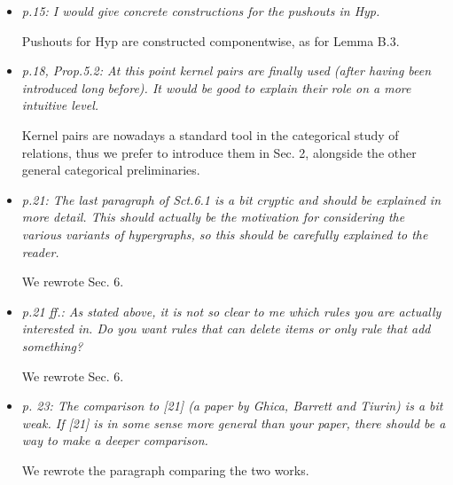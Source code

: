 \documentclass[english,11pt,a4paper]{article}
\begin{document}
\begin{itemize}
		\item \emph{ p.15: I would give concrete constructions for the pushouts in Hyp.}
		
		Pushouts for Hyp are constructed componentwise, as for Lemma B.3.
		
		\item \emph{ p.18, Prop.5.2: At this point kernel pairs are finally used (after
			having been introduced long before). It would be good to explain
			their role on a more intuitive level.}
		
		Kernel pairs are nowadays a standard tool in the categorical study of relations, thus we prefer to introduce them in Sec. 2, alongside the other general categorical preliminaries.
		
		\item \emph{ p.21: The last paragraph of Sct.6.1 is a bit cryptic and should be
			explained in more detail. This should actually be the motivation for
			considering the various variants of hypergraphs, so this should be
			carefully explained to the reader.}
		
		We rewrote Sec. 6.
		
		\item \emph{ p.21 ff.: As stated above, it is not so clear to me which rules
			you are actually interested in. Do you want rules that can delete
			items or only rule that add something?}
		
		We rewrote Sec. 6.
		
		\item \emph{ p. 23: The comparison to [21] (a paper by Ghica, Barrett and Tiurin)
			is a bit weak. If [21] is in some sense more general than your
			paper, there should be a way to make a deeper comparison.}
		
		We rewrote the paragraph comparing the two works.
		
	\end{itemize}


	
\end{document}
